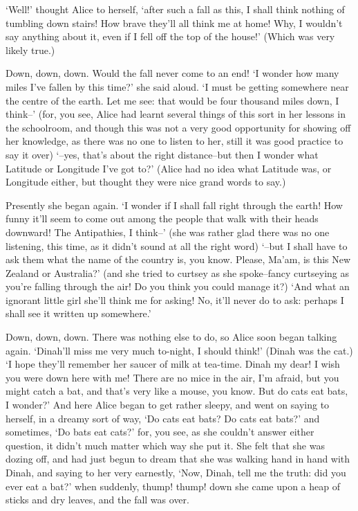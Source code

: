 \documentclass[statementpaper,twoside,openany]{memoir}
\begin{document}
`Well!' thought Alice to herself, `after such a fall as this, I shall think nothing of tumbling down stairs! How brave they'll all think me at home! Why, I wouldn't say anything about it, even if I fell off the top of the house!' (Which was very likely true.)

Down, down, down. Would the fall never come to an end! `I wonder how many miles I've fallen by this time?' she said aloud. `I must be getting somewhere near the centre of the earth. Let me see: that would be four thousand miles down, I think--' (for, you see, Alice had learnt several things of this sort in her lessons in the schoolroom, and though this was not a very good opportunity for showing off her knowledge, as there was no one to listen to her, still it was good practice to say it over) `--yes, that's about the right distance--but then I wonder what Latitude or Longitude I've got to?' (Alice had no idea what Latitude was, or Longitude either, but thought they were nice grand words to say.)

Presently she began again. `I wonder if I shall fall right through the earth! How funny it'll seem to come out among the people that walk with their heads downward! The Antipathies, I think--' (she was rather glad there was no one listening, this time, as it didn't sound at all the right word) `--but I shall have to ask them what the name of the country is, you know. Please, Ma'am, is this New Zealand or Australia?' (and she tried to curtsey as she spoke--fancy curtseying as you're falling through the air! Do you think you could manage it?) `And what an ignorant little girl she'll think me for asking! No, it'll never do to ask: perhaps I shall see it written up somewhere.'

Down, down, down. There was nothing else to do, so Alice soon began talking again. `Dinah'll miss me very much to-night, I should think!' (Dinah was the cat.) `I hope they'll remember her saucer of milk at tea-time. Dinah my dear! I wish you were down here with me! There are no mice in the air, I'm afraid, but you might catch a bat, and that's very like a mouse, you know. But do cats eat bats, I wonder?' And here Alice began to get rather sleepy, and went on saying to herself, in a dreamy sort of way, `Do cats eat bats? Do cats eat bats?' and sometimes, `Do bats eat cats?' for, you see, as she couldn't answer either question, it didn't much matter which way she put it. She felt that she was dozing off, and had just begun to dream that she was walking hand in hand with Dinah, and saying to her very earnestly, `Now, Dinah, tell me the truth: did you ever eat a bat?' when suddenly, thump! thump! down she came upon a heap of sticks and dry leaves, and the fall was over.
\end{document}
